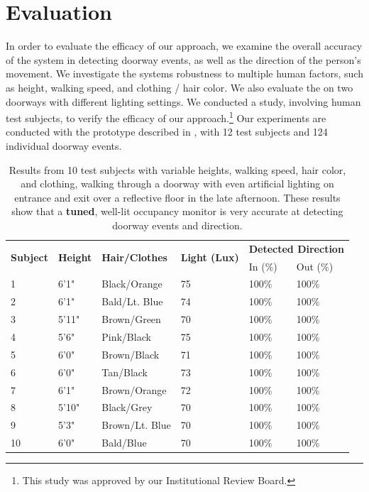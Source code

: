 \section{Evaluation}
\label{sec:evaluation}
In order to evaluate the efficacy of our approach, we examine the overall accuracy of the system in detecting doorway events, as well as the direction of the person's movement.
We investigate the systems robustness to multiple human factors, such as height, walking speed, and clothing / hair color.
We also evaluate the \sysname on two doorways with different lighting settings.
We conducted a study, involving human test subjects, to verify the efficacy of our approach.\footnote{This study was approved by our Institutional Review Board.}
Our experiments are conducted with the \sysname prototype described in , with 12 test subjects and 124 individual doorway events.



\begin{table}[t]
	\begin{tabular}{@{}p{0.8in}p{0.8in}p{1.8in}p{1.0in}p{0.7in}p{0.7in}@{}}
	\toprule
	\multirow{2}{*}{\textbf{Subject}}	&	\multirow{2}{*}{\textbf{Height}} & \multirow{2}{*}{\textbf{Hair/Clothes}} & \multirow{2}{*}{\textbf{Light (Lux)}} & \multicolumn{2}{c}{\textbf{Detected Direction}} 		\\
	& & & & In (\%) & Out (\%) \\\midrule
	1 & 6'1" & Black/Orange & 75 & 100\% & 100\% \\
	2 & 6'1" & Bald/Lt. Blue & 74 & 100\% & 100\% \\
	3 & 5'11" & Brown/Green & 70 & 100\% & 100\% \\
	4 & 5'6" & Pink/Black & 75 & 100\% & 100\% \\
	5 & 6'0" & Brown/Black & 71 & 100\% & 100\% \\
	6 & 6'0" & Tan/Black & 73 & 100\% & 100\% \\
	7 & 6'1" & Brown/Orange & 72 & 100\% & 100\% \\
	8 & 5'10" & Black/Grey & 70 & 100\% & 100\% \\
	9 & 5'3" & Brown/Lt. Blue & 70 & 100\% & 100\% \\
	10 & 6'0" & Bald/Blue & 70 & 100\% & 100\% \\
	\bottomrule
	\end{tabular}
	\caption{Results from 10 test subjects with variable heights, walking speed, hair color, and clothing, walking through a doorway with even artificial lighting on entrance and exit over a reflective floor in the late afternoon. These results show that a \textbf{tuned}, well-lit \sysname occupancy monitor is very accurate at detecting doorway events and direction. \label{tab:detection}}
\end{table}


